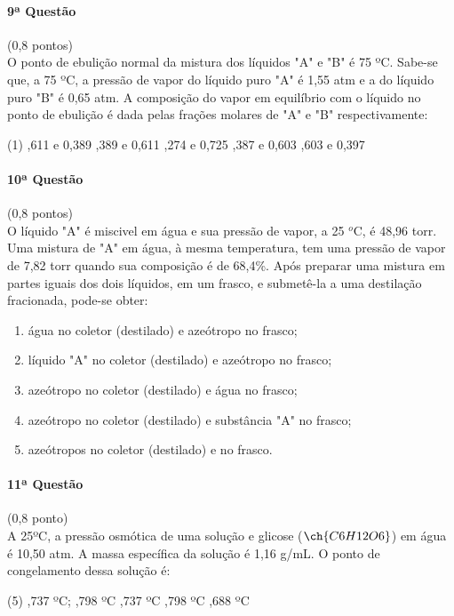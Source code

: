 \documentclass[12pt,a4paper]{article}
\begin{document}
\paragraph{9ª Questão} (0,8 pontos)\\
O ponto de ebulição normal da mistura dos líquidos "A" e "B" é 75 ºC. Sabe-se que, a 75 ºC, a pressão de vapor do líquido puro "A" é 1,55 atm e a do líquido puro "B" é 0,65 atm. A composição do vapor em equilíbrio com o líquido no ponto de ebulição é dada pelas frações molares de "A" e "B" respectivamente:
\begin{tasks}(1)
,611 e 0,389
,389 e 0,611
,274 e 0,725
,387 e 0,603
,603 e 0,397
\end{tasks}

\paragraph{10ª Questão} (0,8 pontos)\\
O líquido "A" é miscivel em água e sua pressão de vapor, a 25 $^o$C, é 48,96 torr. Uma mistura de "A" em água, à mesma temperatura, tem uma pressão de vapor de 7,82 torr quando sua composição é de 68,4\%. Após preparar uma mistura em partes iguais dos dois líquidos, em um frasco, e submetê-la a uma destilação fracionada, pode-se obter:

\begin{enumerate}[label=\alph*)]
\item água no coletor (destilado) e azeótropo no frasco;
\item líquido "A" no coletor (destilado) e azeótropo no frasco;
\item azeótropo no coletor (destilado) e água no frasco;
\item azeótropo no coletor (destilado) e substância "A" no frasco;
\item azeótropos no coletor (destilado) e no frasco.
\end{enumerate}

\paragraph{11ª Questão} (0,8 ponto)\\
A 25ºC, a pressão osmótica de uma solução e glicose ($\ch{C6H12O6}$) em água é 10,50 atm. A massa específica da solução é 1,16 g/mL. O ponto de congelamento dessa solução é:
\begin{tasks}(5)
,737 ºC; ,798 ºC ,737 ºC ,798 ºC ,688 ºC
\end{tasks}
\end{document}
